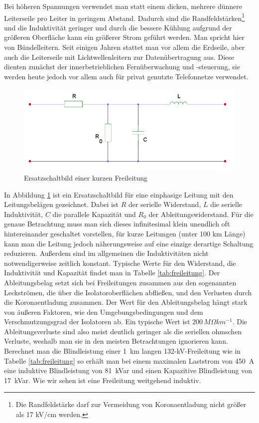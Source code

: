 Bei höheren Spannungen verwendet man statt einem dicken, mehrere dünnere Leiterseile pro Leiter in geringem Abstand. Dadurch sind die Randfeldstärken\footnote{Die Randfeldstärke darf zur Vermeidung von Koronaentladung nicht größer als 17 kV/cm werden.\cite{Flosdorff}} und die Induktivität geringer und durch die bessere Kühlung aufgrund der größeren Oberfläche kann ein größerer Strom geführt werden. Man spricht hier von Bündelleitern.
Seit einigen Jahren stattet man vor allem die Erdseile, aber auch die Leiterseile mit Lichtwellenleitern zur Datenübertragung aus. Diese dienten zunächst der innerbetrieblichen Fernüberwachung und -steuerung, sie werden heute jedoch vor allem auch für privat genutzte Telefonnetze verwendet.\cite{Flosdorff}

\begin{figure}[tbhn]
\begin{center}
\noindent
\includegraphics[scale=0.5]{freileitung.png}
\end{center}
\caption{Ersatzschaltbild einer kurzen Freileitung}
\label{pic:Ersatzschaltbildfreileitung}
\end{figure}

In Abbildung \ref{pic:Ersatzschaltbildfreileitung} ist ein Ersatzschaltbild für eine einphasige Leitung mit den Leitungsbelägen gezeichnet.
Dabei ist $R$ der serielle Widerstand, $L$ die serielle Induktivität, $C$ die parallele Kapazität und $R_0$ der Ableitungswiderstand. Für die genaue Betrachtung muss man sich dieses infinitesimal klein unendlich oft hintereinander geschaltet vorstellen, für kurze Leitungen (unter 100 km Länge) kann man die Leitung jedoch näherungsweise auf eine einzige derartige Schaltung reduzieren\cite{Harrison}.
Außerdem sind im allgemeinen die Induktivitäten nicht notwendigerweise zeitlich konstant\cite{Flosdorff}.
Typische Werte für den Widerstand, die Induktivität und Kapazität findet man in Tabelle \ref{tab:freileitung}.
Der Ableitungsbelag setzt sich bei Freileitungen zusammen aus den sogenannten Leckströmen, die über die Isolator\-oberflächen abfließen, und den Verlusten durch die Koronaentladung zusammen.\cite{Heuck}
Der Wert für den Ableitungsbelag hängt stark von äußeren Faktoren, wie den Umgebungsbedingungen und dem Verschmutzungsgrad der Isolatoren ab. Ein typische Wert ist $200\,M\Omega km^{-1}$.\cite{Harrison} Die Ableitungsverluste sind also meist deutlich geringer als die seriellen ohmschen Verluste, weshalb man sie in den meisten Betrachtungen ignorieren kann.
Berechnet man die Blindleistung einer 1\ km langen 132-kV-Freileitung wie in Tabelle \ref{tab:freileitung} so erhält man bei einem maximalen Laststrom von 450\ A eine induktive Blindleistung von 81\ kVar und einen Kapazitive Blindleistung von 17\ kVar. Wie wir sehen ist eine Freileitung weitgehend induktiv.

